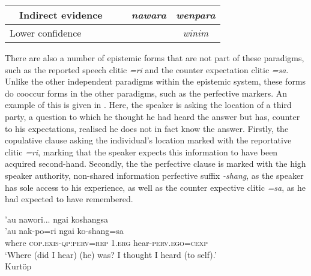 \begin{table}
{\begin{tabular}{llll|c|c|c|c|}
            \multicolumn{1}{|l|}{}                                 & \multicolumn{3}{l|}{Indirect evidence}                & \cellcolor[HTML]{C0C0C0}                       & \cellcolor[HTML]{C0C0C0} & \textit{nawara}          & \textit{wenpara}                                                                                   \\ \hline
            \multicolumn{4}{|l|}{Lower confidence}                 & \cellcolor[HTML]{C0C0C0}                              & \cellcolor[HTML]{C0C0C0}                       & \cellcolor[HTML]{C0C0C0} & \textit{winim}                                                                                                                \\ \hline
        \end{tabular}}
\end{table}

There are also a number of epistemic forms that are not part of these paradigms, such as the reported speech clitic \textit{=ri} and the counter expectation clitic \textit{=sa}. Unlike the other independent paradigms within the epistemic system, these forms do cooccur forms in the other paradigms, such as the perfective markers. An example of this is given in . Here, the speaker is asking the location of a third party, a question to which he thought he had heard the answer but has, counter to his expectations, realised he does not in fact know the answer. Firstly, the copulative clause asking the individual's location marked with the reportative clitic \textit{=ri}, marking that the speaker expects this information to have been acquired second-hand. Secondly, the the perfective clause is marked with the high speaker authority, non-shared information perfective suffix \textit{-shang}, as the speaker has sole access to his experience, as well as the counter expective clitic \textit{=sa}, as he had expected to have remembered.

\begin{exe}
    \ex\label{e:Discussion:KurtopCExp}
    \glll 'au nawori... ngai koshangsa \\
    'au nak-po=ri ngai ko-shang=sa \\
    where \textsc{cop.exis-qp:perv=rep} \textsc{1.erg} hear-\textsc{perv.ego=cexp} \\
    \glt `Where (did I hear) (he) was? I thought I heard (to self).' \\
    Kurtöp \cite[East Bodish: Bhutan,][126]{Hyslop2014}

\end{exe}

